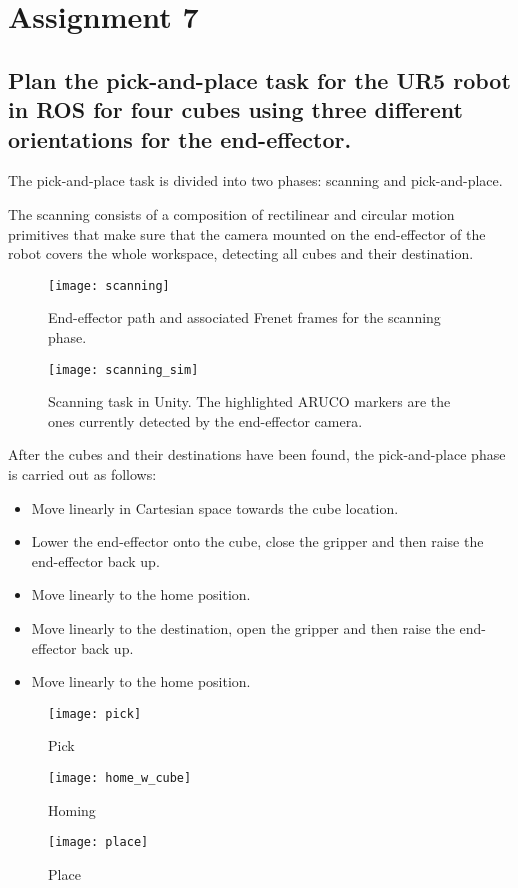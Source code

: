 \section{Assignment 7}

\subsection{Plan the pick-and-place task for the UR5 robot in ROS for four cubes using three different orientations for the end-effector.}

The pick-and-place task is divided into two phases: scanning and pick-and-place.

The scanning consists of a composition of rectilinear and circular motion primitives that make sure that the camera mounted on the end-effector of the robot covers the whole workspace, detecting all cubes and their destination.

\begin{figure}[h]
\centering
\texttt{[image: scanning]}
\caption{End-effector path and associated Frenet frames for the scanning phase.}
\end{figure}

\begin{figure}[h]
\centering
\texttt{[image: scanning\_sim]}
\caption{Scanning task in Unity. The highlighted ARUCO markers are the ones currently detected by the end-effector camera.}
\end{figure}

\newpage

After the cubes and their destinations have been found, the pick-and-place phase is carried out as follows:

\begin{itemize}
\item Move linearly in Cartesian space towards the cube location.
\item Lower the end-effector onto the cube, close the gripper and then raise the end-effector back up.
\item Move linearly to the home position.
\item Move linearly to the destination, open the gripper and then raise the end-effector back up.
\item Move linearly to the home position.
\end{itemize}

\begin{figure}[h]
\centering
\texttt{[image: pick]}
\caption{Pick}
\end{figure}
\begin{figure}[h]
\centering
\texttt{[image: home\_w\_cube]}
\caption{Homing}
\end{figure}
\begin{figure}[h]
\centering
\texttt{[image: place]}
\caption{Place}
\end{figure}